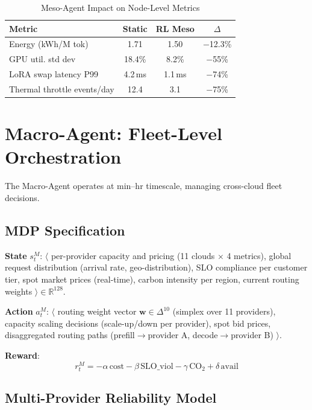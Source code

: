 \documentclass[conference,10pt]{IEEEtran}
\begin{document}
\begin{table}[!htbp]
\caption{Meso-Agent Impact on Node-Level Metrics}
\label{tab:meso}
\centering\scriptsize
\begin{tabular}{@{}lccc@{}}
\toprule
\textbf{Metric} & \textbf{Static} & \textbf{RL Meso} & \textbf{$\Delta$} \\
\midrule
Energy (kWh/M tok) & 1.71 & 1.50 & $-$12.3\% \\
GPU util. std dev & 18.4\% & 8.2\% & $-$55\% \\
LoRA swap latency P99 & 4.2\,ms & 1.1\,ms & $-$74\% \\
Thermal throttle events/day & 12.4 & 3.1 & $-$75\% \\
\bottomrule
\end{tabular}
\end{table}


\section{Macro-Agent: Fleet-Level Orchestration}
\label{sec:macro}

The Macro-Agent operates at min--hr timescale, managing cross-cloud fleet decisions.

\subsection{MDP Specification}

\textbf{State} $s^{M}_t$: $\langle$ per-provider capacity and pricing (11 clouds $\times$ 4 metrics), global request distribution (arrival rate, geo-distribution), SLO compliance per customer tier, spot market prices (real-time), carbon intensity per region, current routing weights $\rangle \in \mathbb{R}^{128}$.

\textbf{Action} $a^{M}_t$: $\langle$ routing weight vector $\mathbf{w} \in \Delta^{10}$ (simplex over 11 providers), capacity scaling decisions (scale-up/down per provider), spot bid prices, disaggregated routing paths (prefill$\to$provider A, decode$\to$provider B) $\rangle$.

\textbf{Reward}:
\begin{equation}
r^{M}_t = -\alpha\,\text{cost} - \beta\,\text{SLO\_viol} - \gamma\,\text{CO}_2 + \delta\,\text{avail}
\end{equation}


\subsection{Multi-Provider Reliability Model}
\end{document}

